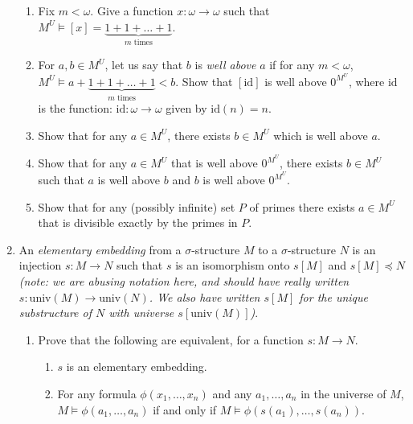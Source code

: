 \documentclass{amsart}
\theoremstyle{definition}
\begin{document}
\begin{enumerate}
  \begin{enumerate}
  \item Fix $m < \omega$. Give a function $x: \omega \to \omega$ such that $M^U \models [x] = \underbrace{1 + 1+ \ldots + 1}_{m \text{ times}}$.
  \item For $a, b \in M^U$, let us say that $b$ is \emph{well above} $a$ if for any $m < \omega$, $M^U \models a + \underbrace{1 + 1 + \ldots + 1}_{m \text{ times}} < b$. Show that $[\text{id}]$ is well above $0^{M^U}$, where $\text{id}$ is the function: $\text{id}: \omega \to \omega$ given by $\text{id} (n) = n$.
  \item Show that for any $a \in M^U$, there exists $b \in M^U$ which is well above $a$.
  \item Show that for any $a \in M^U$ that is well above $0^{M^U}$, there exists $b \in M^U$ such that $a$ is well above $b$ and $b$ is well above $0^{M^U}$.
  \item Show that for any (possibly infinite) set $P$ of primes there exists $a \in M^U$ that is divisible exactly by the primes in $P$.
  \end{enumerate}
  
\item An \emph{elementary embedding} from a $\sigma$-structure $M$ to a $\sigma$-structure $N$ is an injection $s: M \to N$ such that $s$ is an isomorphism onto $s[M]$ and $s[M] \preceq N$ \emph{(note: we are abusing notation here, and should have really written $s: \text{univ} (M) \to \text{univ} (N)$. We also have written $s[M]$ for the unique substructure of $N$ with universe $s[\text{univ} (M)]$)}.

  \begin{enumerate}
  \item Prove that the following are equivalent, for a function $s: M \to N$.

    \begin{enumerate}
    \item $s$ is an elementary embedding.
    \item For any formula $\phi (x_1, \ldots, x_n)$ and any $a_1, \ldots, a_n$ in the universe of $M$, $M \models \phi (a_1, \ldots, a_n)$ if and only if $M \models \phi (s (a_1), \ldots, s (a_n))$.
    \end{enumerate}


\end{enumerate}
\end{enumerate}
\end{document}
